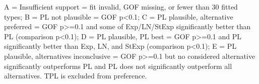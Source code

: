 \begin{flushleft}\footnotesize A = Insufficient support = fit invalid, GOF missing, or fewer than 30 fitted types; B = PL not plausible = GOF p<0.1; C = PL plausible, alternative preferred = GOF p>=0.1 and some of Exp/LN/StExp significantly better than PL (comparison p<0.1); D = PL plausible, PL best = GOF p>=0.1 and PL significantly better than Exp, LN, and StExp (comparison p<0.1); E = PL plausible, alternatives inconclusive = GOF p>=0.1 but no considered alternative significantly outperforms PL and PL does not significantly outperform all alternatives. TPL is excluded from preference.\end{flushleft}

